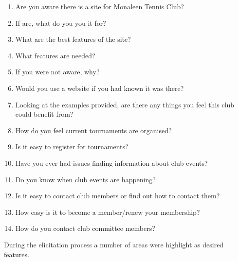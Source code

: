 \begin{enumerate}
\item Are you aware there is a site for Monaleen Tennis Club?
\item If are, what do you you it for?
\item What are the best features of the site? 
\item What features are needed?
\item If you were not aware, why? 
\item Would you use a website if you had known it was there?
\item Looking at the examples provided, are there any things you feel this club could benefit from?
\item How do you feel current tournaments are organised?
\item Is it easy to register for tournaments?
\item Have you ever had issues finding information about club events?
\item Do you know when club events are happening?
\item Is it easy to contact club members or find out how to contact them?
\item How easy is it to become a member/renew your membership?
\item How do you contact club committee members?  
\end{enumerate}


During the elicitation process a number of areas were highlight as desired features.

